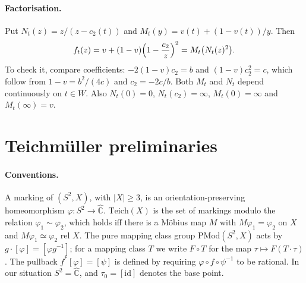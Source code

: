 \documentclass[11pt]{article}
\theoremstyle{definition}
\newcommand{\Teich}{\mathrm{Teich}}
\newcommand{\PMod}{\mathrm{PMod}}
\newcommand{\Ch}{\hat{\mathbb C}}
\begin{document}
\paragraph{Factorisation.} Put $N_t(z)=z/(z-c_2(t))$ and $M_t(y)=v(t)+(1-v(t))/y$. Then
\begin{equation}\label{eq:factor}
f_t(z)=v+(1-v)\Bigl(1-\frac{c_2}{z}\Bigr)^2=M_t\bigl(N_t(z)^2\bigr).
\end{equation}
To check it, compare coefficients: $-2(1-v)c_2=b$ and $(1-v)c_2^2=c$, which follow from $1-v=b^2/(4c)$ and $c_2=-2c/b$. Both $M_t$ and $N_t$ depend continuously on $t\in W$. Also $N_t(0)=0$, $N_t(c_2)=\infty$, $M_t(0)=\infty$ and $M_t(\infty)=v$.

\section{Teichm\"uller preliminaries}\label{sec:teich}

\paragraph{Conventions.} A marking of $(S^2,X)$, with $|X|\ge3$, is an orientation-preserving homeomorphism $\varphi\colon S^2\to\Ch$. $\Teich(X)$ is the set of markings modulo the relation $\varphi_1\sim\varphi_2$, which holds iff there is a M\"obius map $M$ with $M\varphi_1=\varphi_2$ on $X$ and $M\varphi_1\simeq\varphi_2$ rel $X$. The pure mapping class group $\PMod(S^2,X)$ acts by $g\cdot[\varphi]=[\varphi g^{-1}]$; for a mapping class $T$ we write $F\circ T$ for the map $\tau\mapsto F(T\cdot\tau)$. The pullback $f^*[\varphi]=[\psi]$ is defined by requiring $\varphi\circ f\circ\psi^{-1}$ to be rational. In our situation $S^2=\Ch$, and $\tau_0=[\mathrm{id}]$ denotes the base point.
\end{document}
